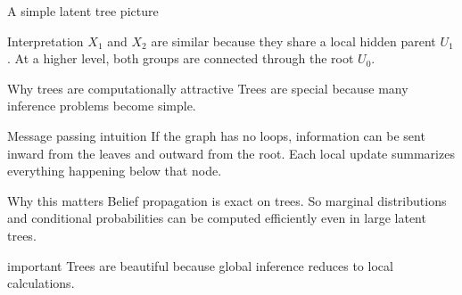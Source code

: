 \documentclass[dvipsnames,aspectratio=169,handout]{beamer}
\begin{document}
\begin{frame}{A simple latent tree picture}
\begin{center}
\end{center}

\begin{alertblock}{Interpretation}
$X_1$ and $X_2$ are similar because they share a local hidden parent $U_1$.
At a higher level, both groups are connected through the root $U_0$.
\end{alertblock}
\end{frame}

\begin{frame}{Why trees are computationally attractive}
Trees are special because many inference problems become simple.

\begin{block}{Message passing intuition}
If the graph has no loops, information can be sent inward from the leaves and outward from the root.
Each local update summarizes everything happening below that node.
\end{block}

\begin{alertblock}{Why this matters}
Belief propagation is exact on trees.
So marginal distributions and conditional probabilities can be computed efficiently even in large latent trees.
\end{alertblock}

\begin{beamercolorbox}[wd=\textwidth,sep=7pt,center,rounded=true,shadow=true]{important}
Trees are beautiful because global inference reduces to local calculations.
\end{beamercolorbox}
\end{frame}
\end{document}
